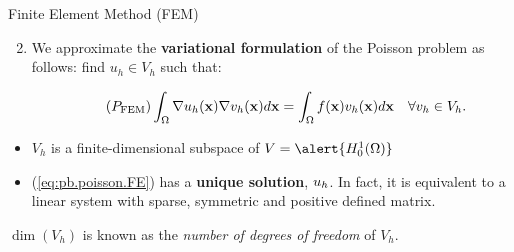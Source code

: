 \begin{frame}{Finite Element Method (FEM) \quad {}}
  \begin{enumerate}
    \setcounter{enumi}{1}
  \item We \alert{approximate the \textbf{variational
        formulation}} of the Poisson problem as follows: \alert{find
    $u_h\in V_h$} such that:
    \begin{BlockNoTitle}
      \begin{equation}
        \tag{\ensuremath{P_{\text{FEM}}}}
        \int_\Omega \grad u_h(\xx) \grad v_h(\xx) d\xx = \int_\Omega f(\xx) v_h(\xx) d\xx \quad \forall v_h\in V_h.
        \label{eq:pb.poisson.FE}
      \end{equation}
    \end{BlockNoTitle}
  \end{enumerate}

 \bigskip

  \begin{proposition}
    \begin{itemize}
    \setlength\itemsep{0.7em}
    \item \alert{$V_h$} is a \alert{finite-dimensional} subspace of
        $V=\alert{H_0^1(\Omega)}$
    \item (\ref{eq:pb.poisson.FE}) has a \alert{\textbf{unique
          solution}}, $u_{h}$. In fact, it is \alert{equivalent to a
        linear system} with sparse, symmetric and positive defined
      matrix.
    \end{itemize}
  \end{proposition}

  \medskip\small
  $\dim(V_h)$ is known as the \textit{number of degrees of freedom} of $V_h$.
\end{frame}


